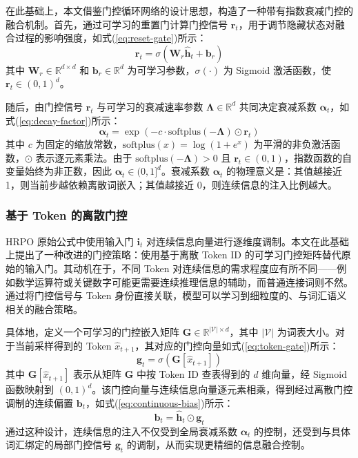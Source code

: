 在此基础上，本文借鉴门控循环网络的设计思想，构造了一种带有指数衰减门控的融合机制。首先，通过可学习的重置门计算门控信号 $\mathbf{r}_t$，用于调节隐藏状态对融合过程的影响强度，如式(\ref{eq:reset-gate})所示：
\begin{equation}\label{eq:reset-gate}
  \mathbf{r}_t = \sigma(\mathbf{W}_r \hat{\mathbf{h}}_t + \mathbf{b}_r)
\end{equation}
其中 $\mathbf{W}_r \in \mathbb{R}^{d \times d}$ 和 $\mathbf{b}_r \in \mathbb{R}^d$ 为可学习参数，$\sigma(\cdot)$ 为 Sigmoid 激活函数，使 $\mathbf{r}_t \in (0, 1)^d$。

随后，由门控信号 $\mathbf{r}_t$ 与可学习的衰减速率参数 $\boldsymbol{\Lambda} \in \mathbb{R}^d$ 共同决定衰减系数 $\boldsymbol{\alpha}_t$，如式(\ref{eq:decay-factor})所示：
\begin{equation}\label{eq:decay-factor}
  \boldsymbol{\alpha}_t = \exp\left(-c \cdot \text{softplus}(-\boldsymbol{\Lambda}) \odot \mathbf{r}_t\right)
\end{equation}
其中 $c$ 为固定的缩放常数，$\text{softplus}(x) = \log(1 + e^x)$ 为平滑的非负激活函数，$\odot$ 表示逐元素乘法。由于 $\text{softplus}(-\boldsymbol{\Lambda}) > 0$ 且 $\mathbf{r}_t \in (0, 1)$，指数函数的自变量始终为非正数，因此 $\boldsymbol{\alpha}_t \in (0, 1]^d$。衰减系数 $\boldsymbol{\alpha}_t$ 的物理意义是：其值越接近 1，则当前步越依赖离散词嵌入；其值越接近 0，则连续信息的注入比例越大。

\subsubsection{基于 Token 的离散门控}

HRPO 原始公式中使用输入门 $\mathbf{i}_t$ 对连续信息向量进行逐维度调制。本文在此基础上提出了一种改进的门控策略：使用基于离散 Token ID 的可学习门控矩阵替代原始的输入门。其动机在于，不同 Token 对连续信息的需求程度应有所不同——例如数学运算符或关键数字可能更需要连续推理信息的辅助，而普通连接词则不然。通过将门控信号与 Token 身份直接关联，模型可以学习到细粒度的、与词汇语义相关的融合策略。

具体地，定义一个可学习的门控嵌入矩阵 $\mathbf{G} \in \mathbb{R}^{|\mathcal{V}| \times d}$，其中 $|\mathcal{V}|$ 为词表大小。对于当前采样得到的 Token $\hat{x}_{t+1}$，其对应的门控向量如式(\ref{eq:token-gate})所示：
\begin{equation}\label{eq:token-gate}
  \mathbf{g}_t = \sigma(\mathbf{G}[\hat{x}_{t+1}])
\end{equation}
其中 $\mathbf{G}[\hat{x}_{t+1}]$ 表示从矩阵 $\mathbf{G}$ 中按 Token ID 查表得到的 $d$ 维向量，经 Sigmoid 函数映射到 $(0, 1)^d$。该门控向量与连续信息向量逐元素相乘，得到经过离散门控调制的连续偏置 $\mathbf{b}_t$，如式(\ref{eq:continuous-bias})所示：
\begin{equation}\label{eq:continuous-bias}
  \mathbf{b}_t = \hat{\mathbf{h}}_t \odot \mathbf{g}_t
\end{equation}
通过这种设计，连续信息的注入不仅受到全局衰减系数 $\boldsymbol{\alpha}_t$ 的控制，还受到与具体词汇绑定的局部门控信号 $\mathbf{g}_t$ 的调制，从而实现更精细的信息融合控制。

